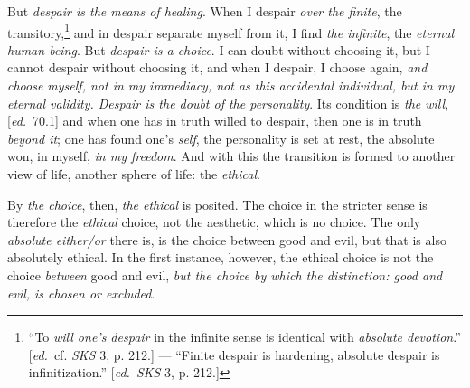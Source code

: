 \documentclass[12pt,a4paper,openany]{book}
\newcommand{\kpage}[1]{\marginnote{\footnotesize\textit{[#1]}}}
\newcommand{\ed}[1]{{\small[\textit{ed.}\ #1]}}
\begin{document}
But \emph{despair is the means of healing}. When I despair \emph{over the finite},
the transitory,\footnote[56]{``To \emph{will one's despair} in the infinite sense is identical with \emph{absolute devotion}.''
\ed{cf. \emph{SKS} 3, p. 212.} --- ``Finite despair is hardening, absolute despair
is infinitization.'' \ed{\emph{SKS} 3, p. 212.}}
and in despair separate myself from it, I find\kpage{131}
\emph{the infinite}, the \emph{eternal human being}. But \emph{despair is a choice}. I
can doubt without choosing it, but I cannot despair without
choosing it, and when I despair, I choose again, \emph{and choose myself, not
in my immediacy, not as this accidental individual, but in my eternal validity.
Despair is the doubt of the personality}. Its condition is \emph{the will}, \ed{70.1} and
when one has in truth willed to despair, then one is in truth \emph{beyond
it}; one has found one's \emph{self}, the personality is set at rest, the absolute
won, in myself, \emph{in my freedom}. And with this the transition is
formed to another view of life, another sphere of life: the \emph{ethical}.

By \emph{the choice}, then, \emph{the ethical} is posited. The choice in the stricter sense is
therefore the \emph{ethical} choice, not the aesthetic, which is no choice.
The only \emph{absolute either/or} there is, is the choice between good and
evil, but that is also absolutely ethical. In the first instance, however, the ethical
choice is not the choice \emph{between} good and evil, \emph{but the choice by which the distinction:
good and evil, is chosen or excluded}.
\end{document}
